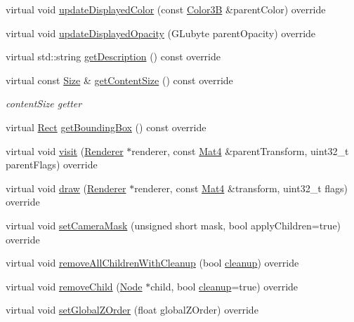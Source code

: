 \begin{DoxyCompactItemize}
virtual void \hyperlink{classLabel_a22ddaa3b9fb25f6295dcd5ac9545202b}{update\+Displayed\+Color} (const \hyperlink{structColor3B}{Color3B} \&parent\+Color) override
\item 
virtual void \hyperlink{classLabel_a20eff3ff123e54a021c4149a7fcf0494}{update\+Displayed\+Opacity} (G\+Lubyte parent\+Opacity) override
\item 
virtual std\+::string \hyperlink{classLabel_ab4b264b43169b883b12043b5a860e901}{get\+Description} () const override
\item 
virtual const \hyperlink{classSize}{Size} \& \hyperlink{classLabel_a3b571f804249bde9c8d8a5b4bb067d3f}{get\+Content\+Size} () const override
\begin{DoxyCompactList}\small\item\em content\+Size getter \end{DoxyCompactList}\item 
virtual \hyperlink{classRect}{Rect} \hyperlink{classLabel_a05bcec134c3319eb75dc3fdebc1ab62e}{get\+Bounding\+Box} () const override
\item 
virtual void \hyperlink{classLabel_ae8e300dcf7e2a6b98e2ae39632d290c8}{visit} (\hyperlink{classRenderer}{Renderer} $\ast$renderer, const \hyperlink{classMat4}{Mat4} \&parent\+Transform, uint32\+\_\+t parent\+Flags) override
\item 
virtual void \hyperlink{classLabel_ac1ceeebcd0a814f22e8b49d40671f140}{draw} (\hyperlink{classRenderer}{Renderer} $\ast$renderer, const \hyperlink{classMat4}{Mat4} \&transform, uint32\+\_\+t flags) override
\item 
virtual void \hyperlink{classLabel_a2766bd9d3aa727ee7c50d730af35b9dc}{set\+Camera\+Mask} (unsigned short mask, bool apply\+Children=true) override
\item 
virtual void \hyperlink{classLabel_a085855ab76a711d7314ae6ae6ce44c47}{remove\+All\+Children\+With\+Cleanup} (bool \hyperlink{classNode_aa2de84c6cdeec9cd647d236c30ee0567}{cleanup}) override
\item 
virtual void \hyperlink{classLabel_a2fc940a01f34e1ea809bb09e1f82575f}{remove\+Child} (\hyperlink{classNode}{Node} $\ast$child, bool \hyperlink{classNode_aa2de84c6cdeec9cd647d236c30ee0567}{cleanup}=true) override
\item 
virtual void \hyperlink{classLabel_a0c53017f28f3e1f2c65f3ea7693a69b2}{set\+Global\+Z\+Order} (float global\+Z\+Order) override
\item 
\mbox{\label{classLabel_a47d6c81137a4b747f0361ace0d2f5cd2}} 

\end{DoxyCompactItemize}
